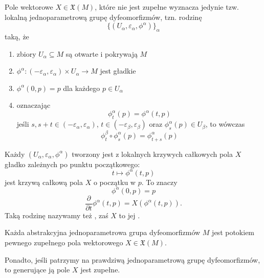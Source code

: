 Pole wektorowe $X\in\mathfrak{X}(M)$, które nie jest zupełne wyznacza jedynie tzw. lokalną jednoparametrową grupę dyfeomorfizmów, tzn. rodzinę
$$\{(U_\alpha,\varepsilon_\alpha,\phi^\alpha)\}_{\alpha}$$
taką, że
\begin{enumerate}
  \item zbiory $U_\alpha\subseteq M$ są otwarte i pokrywają $M$
  \item $\phi^\alpha:(-\varepsilon_\alpha,\varepsilon_\alpha)\times U_\alpha\to M$ jest gładkie
  \item $\phi^\alpha(0,p)=p$ dla każdego $p\in U_\alpha$
  \item oznaczając 
    $$\phi^\alpha_t(p)=\phi^\alpha(t,p)$$
    jeśli $s,s+t\in(-\varepsilon_\alpha,\varepsilon_\alpha)$, $t\in(-\varepsilon_\beta,\varepsilon_\beta)$ oraz $\phi_s^\alpha(p)\in U_\beta$, to wówczas
    $$\phi_t^\beta\circ\phi_s^\alpha(p)=\phi_{t+s}^\alpha(p)$$
\end{enumerate}

Każdy $(U_\alpha,\varepsilon_\alpha,\phi^\alpha)$ tworzony jest z lokalnych krzywych całkowych pola $X$ gładko zależnych po punktu początkowego:
$$t\mapsto \phi^\alpha(t,p)$$
jest krzywą całkową pola $X$ o początku w $p$. To znaczy 
$$\phi^\alpha(0,p)=p$$
$$\frac{\partial}{\partial t}\phi^\alpha(t,p)=X(\phi^\alpha(t,p)).$$
Taką rodzinę nazywamy też , zaś $X$ to jej .

\begin{theorem}
  Każda abstrakcyjna jednoparametrowa grupa dyfeomorfizmów $M$ jest potokiem pewnego zupełnego pola wektorowego $X\in\mathfrak{X}(M)$.

  Ponadto, jeśli patrzymy na prawdziwą jednoparametrową grupę dyfeomorfizmów, to generujące ją pole $X$ jest zupełne.
\end{theorem}

